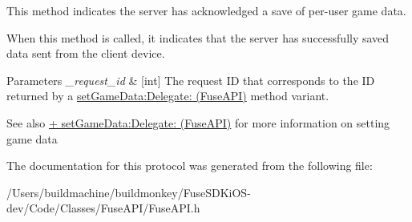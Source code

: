 This method indicates the server has acknowledged a save of per-\/user game data. 

When this method is called, it indicates that the server has successfully saved data sent from the client device. 
\begin{DoxyParams}{Parameters}
{\em \+\_\+request\+\_\+id} & \mbox{[}int\mbox{]} The request I\+D that corresponds to the I\+D returned by a \hyperlink{interface_fuse_a_p_i_a3da637831ec4d7dcd4d45cd7c547cd6a}{set\+Game\+Data\+:\+Delegate\+: (\+Fuse\+A\+P\+I)} method variant. \\
\hline
\end{DoxyParams}
\begin{DoxySeeAlso}{See also}
\hyperlink{interface_fuse_a_p_i_a3da637831ec4d7dcd4d45cd7c547cd6a}{+ set\+Game\+Data\+:\+Delegate\+: (\+Fuse\+A\+P\+I)} for more information on setting game data 
\end{DoxySeeAlso}


The documentation for this protocol was generated from the following file\+:\begin{DoxyCompactItemize}
\item 
/\+Users/buildmachine/buildmonkey/\+Fuse\+S\+D\+Ki\+O\+S-\/dev/\+Code/\+Classes/\+Fuse\+A\+P\+I/Fuse\+A\+P\+I.\+h\end{DoxyCompactItemize}
